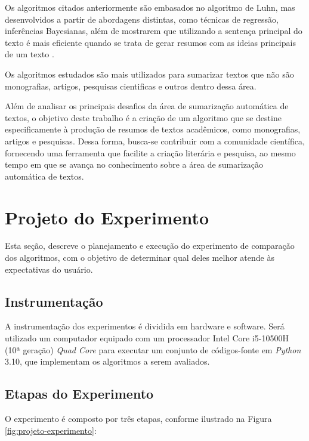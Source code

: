 Os algoritmos citados anteriormente são embasados no algoritmo de Luhn, mas desenvolvidos a partir de abordagens distintas, como técnicas de regressão, inferências Bayesianas, além de mostrarem que utilizando a sentença principal do texto é mais eficiente quando se trata de gerar resumos com as ideias principais de um texto \cite{salvino2019analise}.

Os algoritmos estudados são mais utilizados para sumarizar textos que não são monografias, artigos, pesquisas cientificas e outros dentro dessa área.

Além de analisar os principais desafios da área de sumarização automática de textos, o objetivo deste trabalho é a criação de um algoritmo que se destine especificamente à produção de resumos de textos acadêmicos, como monografias, artigos e pesquisas. Dessa forma, busca-se contribuir com a comunidade científica, fornecendo uma ferramenta que facilite a criação literária e pesquisa, ao mesmo tempo em que se avança no conhecimento sobre a área de sumarização automática de textos.

\section{Projeto do Experimento}
\label{cap:projeto_experimento}

Esta seção, descreve o planejamento e execução do experimento de comparação dos algoritmos, com o objetivo de determinar qual deles melhor atende às expectativas do usuário.

\subsection{Instrumentação}
\label{chap:instrumentacao}

A instrumentação dos experimentos é dividida em hardware e software. Será utilizado um computador equipado com um processador Intel Core i5-10500H (10ª geração) \textit{Quad Core} para executar um conjunto de códigos-fonte em \textit{Python} 3.10, que implementam os algoritmos a serem avaliados.

\subsection{Etapas do Experimento}
\label{chap:experimento}

O experimento é composto por três etapas, conforme ilustrado na Figura \ref{fig:projeto-experimento}:

